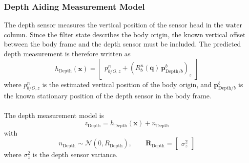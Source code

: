 \subsubsection{Depth Aiding Measurement Model}
The depth sensor measures the vertical position of the sensor head in the water column. Since the filter state describes the body origin, the known vertical offset between the body frame and the depth sensor must be included. The predicted depth measurement is therefore written as
\begin{equation}
    h_{\text{Depth}}(\mathbf{x}) =
    \begin{bmatrix}
        p_{b/O,z}^{n} + \left(R_b^n(\mathbf{q})\,\mathbf{p}_{\text{Depth}/b}^{b}\right)_z
    \end{bmatrix}
    \label{eq:aiding-measurement-model-depth}
\end{equation}
where $p_{b/O,z}^{n}$ is the estimated vertical position of the body origin, and $\mathbf{p}_{\text{Depth}/b}^{b}$ is the known stationary position of the depth sensor in the body frame.
\\ \\
The depth measurement model is
$$
    z_{\text{Depth}} = h_{\text{Depth}}(\mathbf{x}) + n_{\text{Depth}}
$$
with
\begin{equation}
    n_{\text{Depth}} \sim \mathcal{N}(0, R_{\text{Depth}}),
    \qquad
    \mathbf{R}_{\text{Depth}} =
    \begin{bmatrix}
        \sigma_z^2
    \end{bmatrix}
    \label{eq:aiding-measurement-model-depth-noise}
\end{equation}
where $\sigma_z^2$ is the depth sensor variance.



